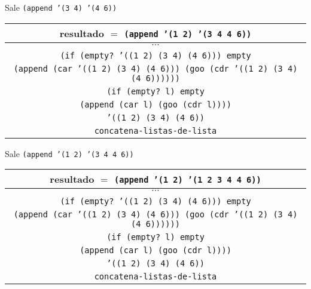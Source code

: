 \documentclass[letterpaper,11pt]{article}
\begin{document}
\begin{enumerate}
\begin{enumerate}
        \newpage
        Sale \texttt{(append '(3 4) '(4 6))}
        \begin{center}
            \begin{tabular}{|c|}
                \hline
                resultado $=$ \texttt{(append '(1 2) '(3 4 4 6))}  \\
                \hline
                $\cdots$ \\
                \hline
                \texttt{(if (empty? '((1 2) (3 4) (4 6))) empty} \\
                \texttt{(append (car '((1 2) (3 4) (4 6))) 
                (goo (cdr '((1 2) (3 4) (4 6))))))} \\
                \hline
                \texttt{(if (empty? l) empty} \\
                \texttt{(append (car l) (goo (cdr l))))} \\
                \hline
                \texttt{'((1 2) (3 4) (4 6))} \\
                \hline
                \texttt{concatena-listas-de-lista} \\
                \hline
            \end{tabular}
        \end{center}

        Sale \texttt{(append '(1 2) '(3 4 4 6))}
        \begin{center}
            \begin{tabular}{|c|}
                \hline
                resultado $=$ \texttt{(append '(1 2) '(1 2 3 4 4 6))} \\
                \hline
                $\cdots$ \\
                \hline
                \texttt{(if (empty? '((1 2) (3 4) (4 6))) empty} \\
                \texttt{(append (car '((1 2) (3 4) (4 6))) 
                (goo (cdr '((1 2) (3 4) (4 6))))))} \\
                \hline
                \texttt{(if (empty? l) empty} \\
                \texttt{(append (car l) (goo (cdr l))))} \\
                \hline
                \texttt{'((1 2) (3 4) (4 6))} \\
                \hline
                \texttt{concatena-listas-de-lista} \\
                \hline
            \end{tabular}
        \end{center}


\end{enumerate}
\end{enumerate}
\end{document}
